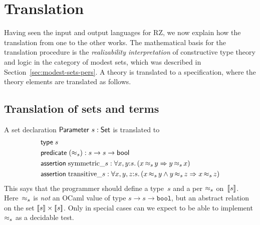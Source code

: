 \section{Translation}
\label{sec:translation}

Having seen the input and output languages for RZ, we now explain how
the translation from one to the other works. The mathematical basis
for the translation procedure is the \emph{realizability
  interpretation} of constructive type theory and logic in the
category of modest sets, which was described in
Section~\ref{sec:modest-sets-pers}. A theory is translated to a
specification, where the theory elements are translated as follows.


\subsection{Translation of sets and terms}
\label{sec:transl-sets-terms}

A set declaration $\mathsf{Parameter}\ s : \mathsf{Set}$ is translated to
%
\begin{align*}
  & \otyspec{s} \\
  & \opropspec{({\approx_{s}})}{\oarrow{s}{\oarrow{s}{\oProp}}}\\
  & \oassertion{\mathrm{symmetric}\_{s}}{
    \oforall{x,y}{s}{(\oimply{\oper{s}{x}{y}}{\oper{s}{y}{x}})}
  }
  \\
  & \oassertion{\mathrm{transitive}\_{s}}{
    \oforall{x,y,z}{s}{(
      \oimply{
        \oper{s}{x}{y} \land \oper{s}{y}{z}
      }{\oper{s}{x}{z}}
      )}
  }
\end{align*}
%
This says that the programmer should define a type~$s$ and a per
$\approx_s$ on~$[\![s]\!]$. Here~$\approx_s$ is \emph{not} an OCaml value
of type $s \to s \to \mathtt{bool}$, but an abstract relation on the
set $[\![s]\!] \times [\![s]\!]$. Only in special cases can we
expect to be able to implement~$\approx_s$ as a decidable test.  

